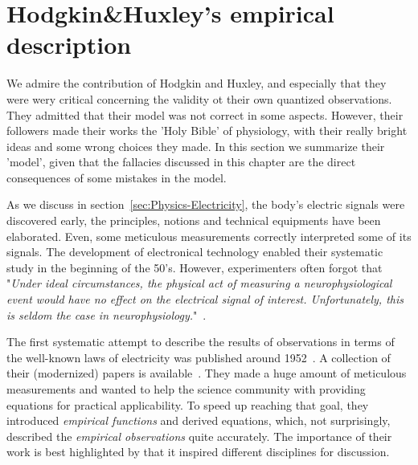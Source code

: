 
\section{Hodgkin\&Huxley's empirical description\label{sec:Physiology-HodgkinHuxley}}


We admire the contribution of Hodgkin and Huxley,
and especially that they were wery critical concerning the validity ot their own quantized observations. They admitted that their model was not correct in some aspects. However,
their followers made their works the 'Holy Bible' of physiology,
with their really bright ideas and some wrong choices they made. In this section we summarize their 'model', given that the fallacies discussed in this chapter are the direct consequences of some mistakes in the model.

As we discuss in section~\ref{sec:Physics-Electricity}, the body's electric signals
were discovered early, the principles, notions and technical equipments have been elaborated.
Even, some meticulous measurements correctly interpreted some of its signals. 
The development of electronical technology enabled their systematic study 
in the beginning of the 50's. However, experimenters 
often forgot that "\textit{Under ideal
circumstances, the physical act of measuring a neurophysiological event
would have no effect on the electrical signal of interest. Unfortunately,
this is seldom the case in neurophysiology.}"~\cite{JohnstonWuNeurophysiology:1995}.
	

The first systematic attempt to describe the results of observations in terms of the well-known laws of electricity
 was published around 1952~\cite{HodgkinHuxley:1952}.
A collection of their (modernized) papers is available~\cite{CompanionGuideHodgkinHuxley:2022}.
They made a huge amount of \hypertarget{HHmeasurements}{meticulous measurements}
and wanted to help the science community with providing equations for practical applicability.
To speed up reaching that goal, they introduced \textit{empirical functions} 
and derived equations, which, not surprisingly, described the \textit{empirical observations} quite accurately. 
The importance of their work is best highlighted by that it inspired 
different disciplines for discussion. 


